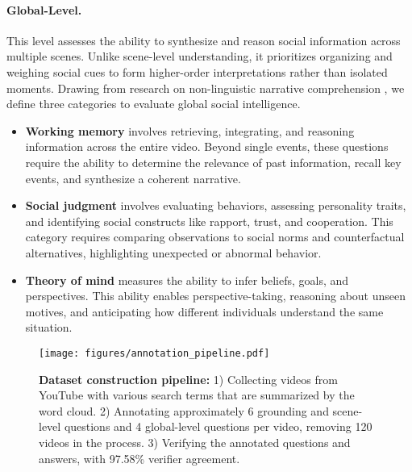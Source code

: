 \paragraph{Global-Level.} This level assesses the ability to synthesize and reason social information across multiple scenes. Unlike scene-level understanding, it prioritizes organizing and weighing social cues to form higher-order interpretations rather than isolated moments. Drawing from research on non-linguistic narrative comprehension \cite{baron1986mechanical, kuijper2017narrative, adornetti2023comprehending}, we define three categories to evaluate global social intelligence.
\begin{itemize}[noitemsep,topsep=0pt,nosep,leftmargin=*,parsep=0pt,partopsep=0pt]
    \item \textbf{Working memory} \cite{daneman1996working} involves retrieving, integrating, and reasoning information across the entire video. Beyond single events, these questions require the ability to determine the relevance of past information, recall key events, and synthesize a coherent narrative. 
    \item \textbf{Social judgment} \cite{kahneman1986norm} involves evaluating behaviors, assessing personality traits, and identifying social constructs like rapport, trust, and cooperation. This category requires comparing observations to social norms and counterfactual alternatives, highlighting unexpected or abnormal behavior.
    \item \textbf{Theory of mind} \cite{astington1995theory} measures the ability to infer beliefs, goals, and perspectives. This ability enables perspective-taking, reasoning about unseen motives, and anticipating how different individuals understand the same situation.
\end{itemize}

\begin{figure}[t!]
    \centering
    \texttt{[image: figures/annotation\_pipeline.pdf]}
    \vspace{2mm}
    \caption{\textbf{Dataset construction pipeline:} 1) Collecting videos from YouTube with various search terms that are summarized by the word cloud. 2) Annotating approximately 6 grounding and scene-level questions and 4 global-level questions per video, removing 120 videos in the process. 3) Verifying the annotated questions and answers, with 97.58\% verifier agreement.}
    \vspace{-2mm}
    \label{fig:dataset_pipeline}
\end{figure}


